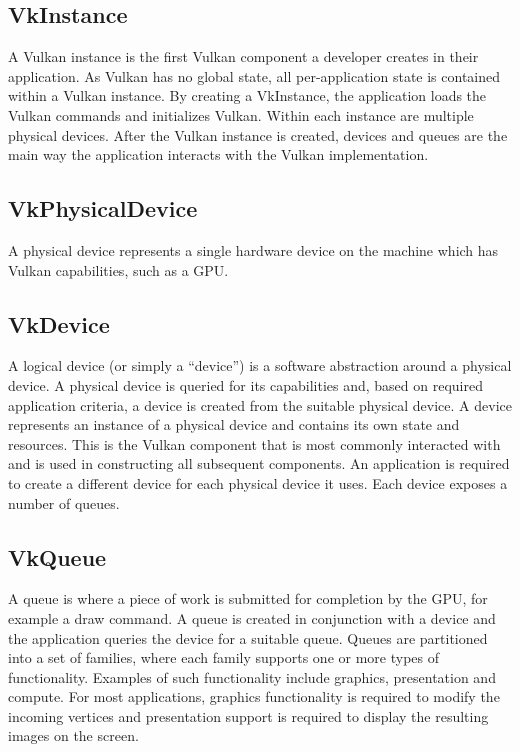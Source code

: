 \documentclass[12pt]{report}
\theoremstyle{definition}
\begin{document}
      \subsection{VkInstance}
      
        A Vulkan instance is the first Vulkan component a developer creates in
        their application.  As Vulkan has no global state, all per-application
        state is contained within a Vulkan instance. By creating a VkInstance,
        the application loads the Vulkan commands and initializes Vulkan.
        Within each instance are multiple physical devices. After the Vulkan
        instance is created, devices and queues are the main
        way the application interacts with the Vulkan implementation.

      \subsection{VkPhysicalDevice}

        A physical device represents a single hardware device on the machine
        which has Vulkan capabilities, such as a GPU.

      \subsection{VkDevice}

        A logical device (or simply a ``device'') is a software abstraction around a
        physical device. A physical device is queried for its capabilities and,
        based on required application criteria, a device is created from the
        suitable physical device. A device represents an instance of a
        physical device and contains its own state and resources. This is
        the Vulkan component that is most commonly interacted with and is
        used in constructing all subsequent components. An application is
        required to create a different device for each physical device it uses.
        Each device exposes a number of queues.

      \subsection{VkQueue}

        A queue is where a piece of work is submitted for completion by the GPU,
        for example a draw command. A queue is created in conjunction with a
        device and the application queries the device for a suitable queue.
        Queues are partitioned into a set of families, where each family
        supports one or more types of functionality. Examples of such
        functionality include graphics, presentation and compute. For most
        applications, graphics functionality is required to modify the
        incoming vertices and presentation support is required to display
        the resulting images on the screen. \\
\end{document}
